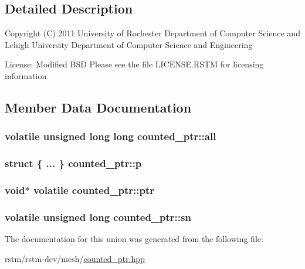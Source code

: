 \subsection{Detailed Description}
Copyright (C) 2011 University of Rochester Department of Computer Science and Lehigh University Department of Computer Science and Engineering

License\-: Modified B\-S\-D Please see the file L\-I\-C\-E\-N\-S\-E.\-R\-S\-T\-M for licensing information 

\subsection{Member Data Documentation}
\hypertarget{unioncounted__ptr_a3c019eb2e8a407efe66a4aa8255c5f5b}{
\subsubsection[{all}]{\setlength{\rightskip}{0pt plus 5cm}volatile unsigned long long counted\-\_\-ptr\-::all}}\label{unioncounted__ptr_a3c019eb2e8a407efe66a4aa8255c5f5b}
\hypertarget{unioncounted__ptr_ade3e233814206e384de576f266f86a85}{
\subsubsection[{p}]{\setlength{\rightskip}{0pt plus 5cm}struct \{ ... \}   counted\-\_\-ptr\-::p}}\label{unioncounted__ptr_ade3e233814206e384de576f266f86a85}
\hypertarget{unioncounted__ptr_ad89a77929a97e242aae96601a3e4d6c6}{
\subsubsection[{ptr}]{\setlength{\rightskip}{0pt plus 5cm}void$\ast$ volatile counted\-\_\-ptr\-::ptr}}\label{unioncounted__ptr_ad89a77929a97e242aae96601a3e4d6c6}
\hypertarget{unioncounted__ptr_aaccb382672a1ba4e91dd8dae03010069}{
\subsubsection[{sn}]{\setlength{\rightskip}{0pt plus 5cm}volatile unsigned long counted\-\_\-ptr\-::sn}}\label{unioncounted__ptr_aaccb382672a1ba4e91dd8dae03010069}


The documentation for this union was generated from the following file\-:\begin{DoxyCompactItemize}
\item 
rstm/rstm-\/dev/mesh/\hyperlink{counted__ptr_8hpp}{counted\-\_\-ptr.\-hpp}\end{DoxyCompactItemize}
